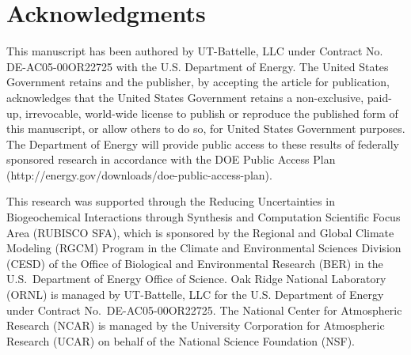 \documentclass{agujournal}
\begin{document}
\clearpage
\section*{Acknowledgments}\label{sec:ack}

This manuscript has been authored by UT-Battelle, LLC under Contract No. DE-AC05-00OR22725 with the U.S. Department of Energy. The United States Government retains and the publisher, by accepting the article for publication, acknowledges that the United States Government retains a non-exclusive, paid-up, irrevocable, world-wide license to publish or reproduce the published form of this manuscript, or allow others to do so, for United States Government purposes. The Department of Energy will provide public access to these results of federally sponsored research in accordance with the DOE Public Access Plan (http://energy.gov/downloads/doe-public-access-plan).

This research was supported through the Reducing Uncertainties in Biogeochemical Interactions through Synthesis and Computation Scientific Focus Area (RUBISCO SFA), which is sponsored by the Regional and Global Climate Modeling (RGCM) Program in the Climate and Environmental Sciences Division (CESD) of the Office of Biological and Environmental Research (BER) in the U.S.\ Department of Energy Office of Science.  Oak Ridge National Laboratory (ORNL) is managed by UT-Battelle, LLC for the U.S. Department of Energy under Contract No.\ DE-AC05-00OR22725. The National Center for Atmospheric Research (NCAR) is managed by the University Corporation for Atmospheric Research (UCAR) on behalf of the National Science Foundation (NSF).


\end{document}
